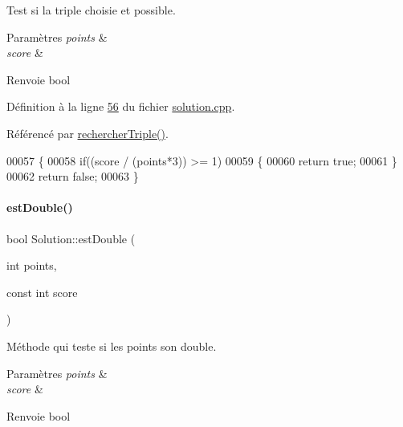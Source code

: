 Test si la triple choisie et possible. 


\begin{DoxyParams}{Paramètres}
{\em points} & \\
\hline
{\em score} & \\
\hline
\end{DoxyParams}
\begin{DoxyReturn}{Renvoie}
bool 
\end{DoxyReturn}


Définition à la ligne \hyperlink{solution_8cpp_source_l00056}{56} du fichier \hyperlink{solution_8cpp_source}{solution.\+cpp}.



Référencé par \hyperlink{solution_8cpp_source_l00074}{rechercher\+Triple()}.


\begin{DoxyCode}
00057 \{
00058     \textcolor{keywordflow}{if}((score / (points*3)) >= 1)
00059     \{
00060         \textcolor{keywordflow}{return} \textcolor{keyword}{true};
00061     \}
00062     \textcolor{keywordflow}{return} \textcolor{keyword}{false};
00063 \}
\end{DoxyCode}
\mbox{\label{class_solution_add9d51c9612fa89361df0908e10779b8}} 
\paragraph{\texorpdfstring{est\+Double()}{estDouble()}}
{\footnotesize\ttfamily bool Solution\+::est\+Double (\begin{DoxyParamCaption}\item[{int}]{points,  }\item[{const int}]{score }\end{DoxyParamCaption})\hspace{0.3cm}{\ttfamily [private]}}



Méthode qui teste si les points son double. 


\begin{DoxyParams}{Paramètres}
{\em points} & \\
\hline
{\em score} & \\
\hline
\end{DoxyParams}
\begin{DoxyReturn}{Renvoie}
bool 
\end{DoxyReturn}


